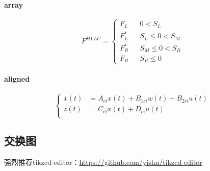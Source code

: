 \paragraph{array}
\begin{equation}
    F^{HLLC}=\left\{
    \begin{array}{rcl}
    F_L       &      & {0      <      S_L}\\
    F^*_L     &      & {S_L \leq 0 < S_M}\\
    F^*_R     &      & {S_M \leq 0 < S_R}\\
    F_R       &      & {S_R \leq 0}
    \end{array} \right. 
\end{equation}
    
\paragraph{aligned}
\begin{equation}
    \left\{
    \begin{aligned}
    \overset{.}x(t) &=A_{ci}x(t)+B_{1ci}w(t)+B_{2ci}u(t)  \\
    z(t) &=C_{ci}x(t)+D_{ci}u(t) \\
    \end{aligned}
    \right.
\end{equation}

\subsection{交换图}
\begin{sloppypar}
强烈推荐tikzcd-editor：\url{https://github.com/yishn/tikzcd-editor}
\end{sloppypar}

\begin{center}
\end{center}

\begin{center}
\end{center}

